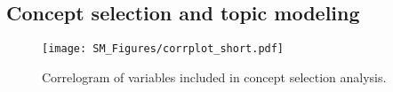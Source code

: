 \documentclass[onecolumn]{article}
\begin{document}

 \clearpage
 \newpage

\subsection{Concept selection and topic modeling}


\begin{figure}[!h]
\centering
\texttt{[image: SM\_Figures/corrplot\_short.pdf]}
\caption{Correlogram of variables included in concept selection analysis.}
\label{fig:corr_short}
\end{figure}
\end{document}
